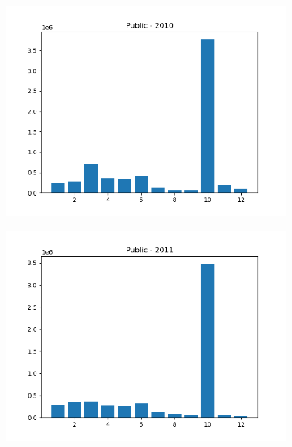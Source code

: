 \documentclass{article}
\begin{document}
\begin{figure}[H]
\begin{subfigure}{.5\textwidth}
        \includegraphics[width=\textwidth]{../../output/figures/annual_source_distribution/Public_data_dist_2010.png}
    \end{subfigure}
    \begin{subfigure}{.5\textwidth}
        \centering
        \includegraphics[width=\textwidth]{../../output/figures/annual_source_distribution/Public_data_dist_2011.png}
    \end{subfigure}
\end{figure}

\newpage 
\end{document}
